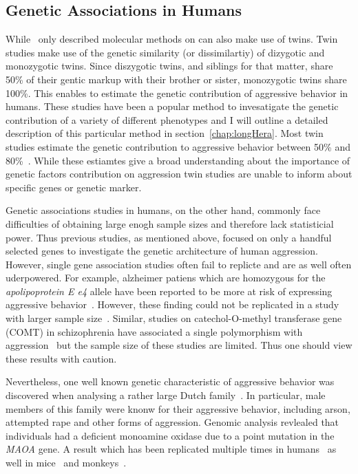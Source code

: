 \subsection{Genetic Associations in Humans}
\label{sub:genetic_associations_in_humans}
While~\citet{Maxson2005} only described molecular methods on can also make use of twins.
Twin studies make use of the genetic similarity (or dissimilartiy) of dizygotic and monozygotic twins.
Since diszygotic twins, and siblings for that matter, share 50\% of their gentic markup with their brother or sister, monozygotic twins share 100\%.
This enables to estimate the genetic contribution of aggressive behavior in humans.
These studies have been a popular method to invesatigate the genetic contribution of a variety of different phenotypes and I will outline a detailed description of this particular method in section~\ref{chap:longHera}.
Most twin studies estimate the genetic contribution to aggressive behavior between 50\% and 80\%~\cite{Porsch2015}.
While these estiamtes give a broad understanding about the importance of genetic factors contribution on aggression twin studies are unable to inform about specific genes or genetic marker.

Genetic associations studies in humans, on the other hand, commonly face difficulties of obtaining large enogh sample sizes and therefore lack statisticial power.
Thus previous studies, as mentioned above, focused on only a handful selected genes to investigate the genetic architecture of human aggression.
However, single gene association studies often fail to replicte and are as well often uderpowered.
For example, alzheimer patiens which are homozygous for the \textit{apolipoprotein E e4} allele have been reported to be more at risk of expressing aggressive behavior~\cite{Craig2004a,VanDerFlier2006}.
However, these finding could not be replicated in a study with larger sample size~\cite{Hollingworth2006a}.
Similar, studies on catechol-O-methyl transferase gene (COMT) in schizophrenia have associated a single polymorphism with aggression~\cite{Hirata2013,Calati2011} but the sample size of these studies are limited.
Thus one should view these results with caution.

Nevertheless, one well known genetic characteristic of aggressive behavior was discovered when analysing a rather large Dutch family~\cite{Brunner1993a}.
In particular, male members of this family were knonw for their aggressive behavior, including arson, attempted rape and other forms of aggression.
Genomic analysis revlealed that individuals had a deficient monoamine oxidase due to a point mutation in the \textit{MAOA} gene.
A result which has been replicated multiple times in humans~\cite{Huang2004,Manuck2000} as well in mice~\cite{Cases1995b} and monkeys~\cite{Newman2005}.

